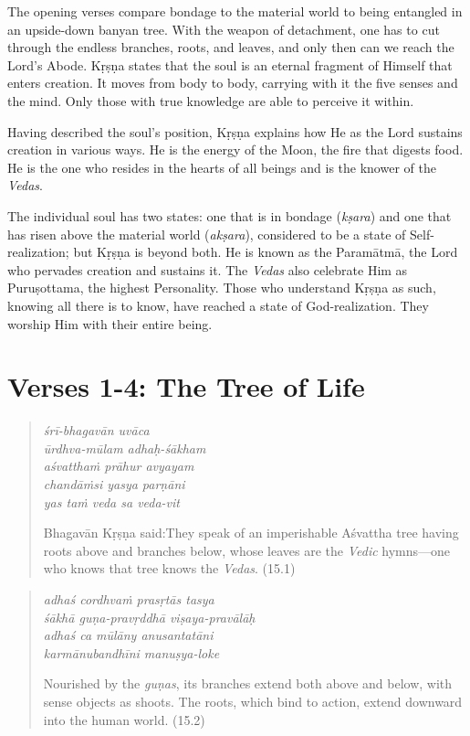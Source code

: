 \documentclass[12pt, twoside, openright]{memoir}
\begin{document}
The opening verses compare bondage to the material world to being entangled in an upside-down banyan tree. With the weapon of detachment, one has to cut through the endless branches, roots, and leaves, and only then can we reach the Lord’s Abode. Kṛṣṇa states that the soul is an eternal fragment of Himself that enters creation. It moves from body to body, carrying with it the five senses and the mind. Only those with true knowledge are able to perceive it within.

Having described the soul’s position, Kṛṣṇa explains how He as the Lord sustains creation in various ways. He is the energy of the Moon, the fire that digests food. He is the one who resides in the hearts of all beings and is the knower of the \textit{Vedas}.

The individual soul has two states: one that is in bondage (\textit{kṣara}) and one that has risen above the material world (\textit{akṣara}), considered to be a state of Self-realization; but Kṛṣṇa is beyond both. He is known as the Paramātmā, the Lord who pervades creation and sustains it. The \textit{Vedas} also celebrate Him as Puruṣottama, the highest Personality. Those who understand Kṛṣṇa as such, knowing all there is to know, have reached a state of God-realization. They worship Him with their entire being.

\section{Verses 1-4: The Tree of Life}\label{sec-verses-1-4-the-tree-of-life}


\par
\begin{verse}
\textit{śrī-bhagavān uvāca} \\
\textit{ūrdhva-mūlam adhaḥ-śākham} \\
\textit{aśvatthaṁ prāhur avyayam} \\
\textit{chandāṁsi yasya parṇāni} \\
\textit{yas taṁ veda sa veda-vit}

\noindent \quad Bhagavān Kṛṣṇa said:\linebreak They speak of an imperishable Aśvattha tree having roots above and branches below, whose leaves are the \textit{Vedic} hymns---one who knows that tree knows the \textit{Vedas}. (15.1)
\end{verse}
\par



\par
\begin{verse}
\textit{adhaś cordhvaṁ prasṛtās tasya} \\
\textit{śākhā guṇa-pravṛddhā viṣaya-pravālāḥ} \\
\textit{adhaś ca mūlāny anusantatāni} \\
\textit{karmānubandhīni manuṣya-loke}

\noindent Nourished by the \textit{guṇas}, its branches extend both above and below, with sense objects as shoots. The roots, which bind to action, extend downward into the human world. (15.2)
\end{verse}
\par
\end{document}
